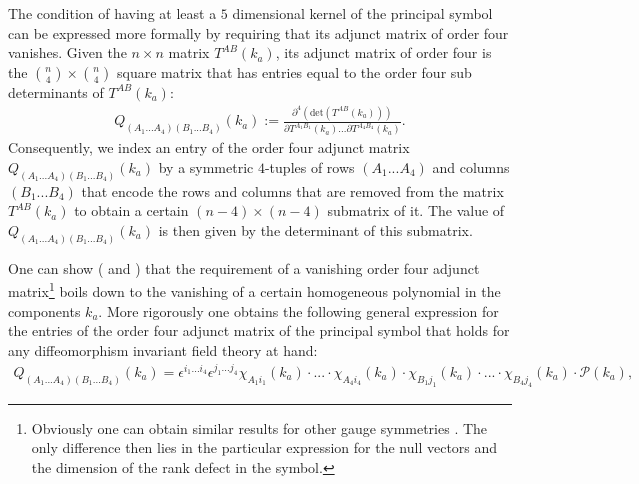 The condition of having at least a $5$ dimensional kernel of the principal symbol can be expressed more formally by requiring that its adjunct matrix of order four vanishes. Given the $n \times n$ matrix $T^{AB}(k_a)$, its adjunct matrix of order four is the $\binom{n}{4} \times \binom{n}{4}$ square matrix that has entries equal to the order four sub determinants of $T^{AB}(k_a)$:
\begin{align}\label{MinorDef}
    Q_{(A_1...A_4) (B_1...B_4)}(k_a) := \frac{\partial^4 (\mathrm{det}(T^{AB}(k_a)))}{\partial T^{A_1 B_1}(k_a) ... \partial T^{A_4 B_4}(k_a)}.
\end{align}
Consequently, we index an entry of the order four adjunct matrix $Q_{(A_1...A_4) (B_1...B_4)}(k_a)$ by a symmetric $4$-tuples of rows $(A_1...A_4)$ and columns $(B_1...B_4)$ that encode the rows and columns that are removed from the matrix $T^{AB}(k_a)$ to obtain a certain $(n-4) \times (n-4)$ submatrix of it. The value of $Q_{(A_1...A_4) (B_1...B_4)}(k_a)$ is then given by the determinant of this submatrix. 

One can show (\cite{2018PhRvD..97h4036D} and \cite{2009JPhA...42U5402I}) that the requirement of a vanishing order four adjunct matrix\footnote{Obviously one can obtain similar results for other gauge symmetries \cite{2018PhRvD..97h4036D}. The only difference then lies in the particular expression for the null vectors and the dimension of the rank defect in the symbol.} boils down to the vanishing of a certain homogeneous polynomial in the components $k_a$. More rigorously one obtains the following general expression for the entries of the order four adjunct matrix of the principal symbol that holds for any diffeomorphism invariant field theory at hand:
\begin{align}\label{diffeoMinor}
    Q_{(A_1...A_4) (B_1...B_4)}(k_a) = \epsilon^{i_1...i_4} \epsilon^{j_1...j_4} \chi_{A_1i_1}(k_a) \cdot ... \cdot \chi_{A_4i_4}(k_a) \cdot \chi_{B_1j_1}(k_a) \cdot ... \cdot \chi_{B_4j_4}(k_a) \cdot \mathcal{P}(k_a),
\end{align}

